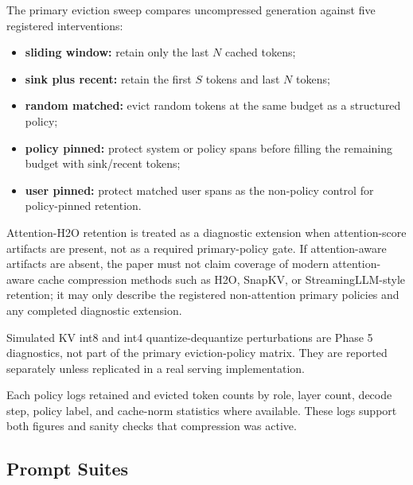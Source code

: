 \documentclass[11pt]{article}
\begin{document}
The primary eviction sweep compares uncompressed generation against five registered interventions:
\begin{itemize}
  \item \textbf{sliding window:} retain only the last $N$ cached tokens;
  \item \textbf{sink plus recent:} retain the first $S$ tokens and last $N$ tokens;
  \item \textbf{random matched:} evict random tokens at the same budget as a structured policy;
  \item \textbf{policy pinned:} protect system or policy spans before filling the remaining budget with sink/recent tokens;
  \item \textbf{user pinned:} protect matched user spans as the non-policy control for policy-pinned retention.
\end{itemize}
Attention-H2O retention is treated as a diagnostic extension when attention-score artifacts are present, not as a required primary-policy gate.
If attention-aware artifacts are absent, the paper must not claim coverage of modern attention-aware cache compression methods such as H2O, SnapKV, or StreamingLLM-style retention; it may only describe the registered non-attention primary policies and any completed diagnostic extension.

Simulated KV int8 and int4 quantize-dequantize perturbations are Phase 5 diagnostics, not part of the primary eviction-policy matrix. They are reported separately unless replicated in a real serving implementation.

Each policy logs retained and evicted token counts by role, layer count, decode step, policy label, and cache-norm statistics where available. These logs support both figures and sanity checks that compression was active.

\subsection{Prompt Suites}
\end{document}
